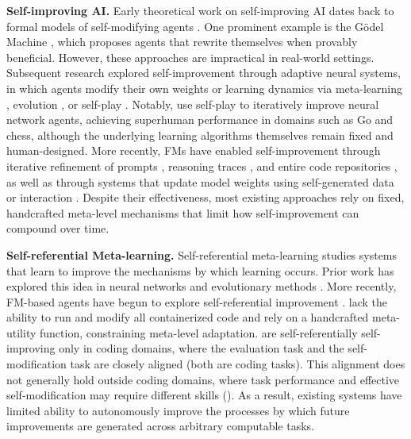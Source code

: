 \documentclass[]{fairmeta}
\begin{document}
\textbf{Self-improving AI.}
Early theoretical work on self-improving AI dates back to formal models of self-modifying agents \citep{hutter2003gentle}. One prominent example is the G\"odel Machine \citep{schmidhuber2007godel}, which proposes agents that rewrite themselves when provably beneficial. However, these approaches are impractical in real-world settings. Subsequent research explored self-improvement through adaptive neural systems, in which agents modify their own weights or learning dynamics via meta-learning \citep{schmidhuber1993neural, irie2022modern, chalvidal2022meta, oh2025discovering}, evolution \citep{stanley2002evolving, lange2023discovering, qiu2025evolution, zhao2025automated}, or self-play \citep{silver2016mastering, silver2017mastering, xia2025agent0}. Notably, \citet{silver2017mastering} use self-play to iteratively improve neural network agents, achieving superhuman performance in domains such as Go and chess, although the underlying learning algorithms themselves remain fixed and human-designed. More recently, FMs have enabled self-improvement through iterative refinement of prompts \citep{wang2025evolving, fernando2023promptbreeder, zhang2025agentic, zhang2025recursive}, reasoning traces \citep{zelikman2022star, yin2025godel, havrilla2024teaching, zhuge2024gptswarm}, and entire code repositories \citep{zhang2025darwin, wang2025huxley, xia2025live}, as well as through systems that update model weights using self-generated data or interaction \citep{wu2024copilot, zweiger2025self, wen2025unsupervised, wei2025toward}. Despite their effectiveness, most existing approaches rely on fixed, handcrafted meta-level mechanisms that limit how self-improvement can compound over time.

\textbf{Self-referential Meta-learning.} Self-referential meta-learning studies systems that learn to improve the mechanisms by which learning occurs. Prior work has explored this idea in neural networks \citep{kirsch2022eliminating, jackson2024discovering} and evolutionary methods \citep{lu2023arbitrary}. More recently, FM-based agents have begun to explore self-referential improvement \citep{zelikman2024self, robeyns2025self, zhang2025darwin, wang2025huxley}. \citet{zelikman2024self} lack the ability to run and modify all containerized code and rely on a handcrafted meta-utility function, constraining meta-level adaptation. \citet{robeyns2025self, zhang2025darwin, wang2025huxley} are self-referentially self-improving only in coding domains, where the evaluation task and the self-modification task are closely aligned (both are coding tasks). This alignment does not generally hold outside coding domains, where task performance and effective self-modification may require different skills (). As a result, existing systems have limited ability to autonomously improve the processes by which future improvements are generated across arbitrary computable tasks.
\end{document}
